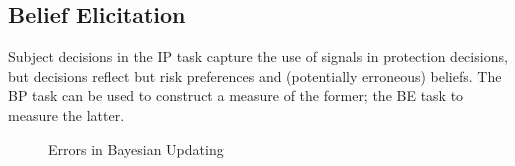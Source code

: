 \documentclass[12pt,a4paper]{article}
\begin{document}
\subsection{Belief Elicitation}
Subject decisions in the IP task capture the use of signals in protection decisions, but decisions reflect but risk preferences and (potentially erroneous) beliefs.  The BP task can be used to construct a measure of the former; the BE task to measure the latter.  



\begin{figure}[H]
	\centering
	\caption{Errors in Bayesian Updating} \label{fig:BeliefUpdate}
	\hfill
	\hfill
	\vspace{2em}
	\hfill

\end{figure}
\end{document}

